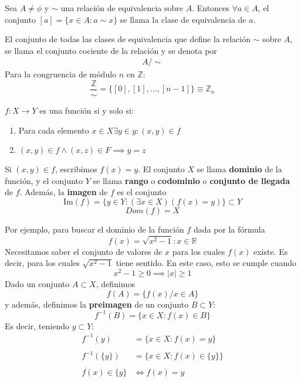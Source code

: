 \documentclass{../Topologia.tex}
\begin{document}
\begin{defin}
Sea $A \neq \phi$ y $\sim$ una relación de equivalencia sobre $A$. Entonces $\forall a \in A$, el conjunto $[a] = \{ x \in A : a \sim x \}$ se llama la clase de equivalencia de $a$.
\end{defin}

\begin{defin}
El conjunto de todas las clases de equivalencia que define la relación $\sim$ sobre $A$, se llama el conjunto cociente de la relación y se denota por
\begin{equation}
	\begin{split}
\boxed{A / \sim}
	\end{split}
\end{equation}
Para la congruencia de módulo $n$ en $\mathbb{Z}$:
$$
\frac{\mathbb{Z}}{\sim} = \{ [0],[1],\dots,[n-1] \} \equiv \mathbb{Z}_{n}
$$
\end{defin}

\begin{defin}
$f:X\to Y$ es una función si y solo si:
\begin{enumerate}
    \item Para cada elemento $x \in X \exists y \in y : (x,y) \in f$
    \item $(x,y) \in f \wedge (x,z) \in F \implies y = z$
\end{enumerate}
Si $(x,y) \in f$, escribimos $f(x)=y$. El conjunto $X$ se llama \textbf{dominio} de la función, y el conjunto $Y$ se llama \textbf{rango} o \textbf{codominio} o \textbf{conjunto de llegada} de $f$.
Además, la \textbf{imagen} de $f$ es el conjunto
$$
\mathrm{Im}(f)=\{ y \in Y : (\exists x \in X)(f(x)=y) \} \subset Y
$$
$$
Dom (f) = X
$$
\end{defin}

Por ejemplo, para buscar el dominio de la función $f$ dada por la fórmula
$$
f(x)=\sqrt{ x^{2}-1 }:x \in \mathbb{R}
$$
Necesitamos saber el conjunto de valores de $x$ para los cuales $f(x)$ existe. Es decir, para los cuales $\sqrt{ x^{2}-1 }$ tiene sentido. En este caso, esto se cumple cuando
$$
x^{2}-1\geq 0 \implies |x|\geq 1
$$
\vspace{1em}
Dado un conjunto $A \subset X$, definimos
$$
f(A)= \{ f(x) / x \in A \}
$$
y además, definimos la \textbf{preimagen} de un conjunto $B \subset Y$:
$$
f^{-1}(B)= \{ x \in X : f(x) \in B \}
$$
Es decir, teniendo $y \subset Y$:
\begin{equation}
	\begin{split}
f^{-1}(y)&= \{ x \in X : f(x)=y \}\\ \\
f^{-1}(\{ y \})&= \{ x \in X : f(x)\in \{ y \} \}\\ \\
f(x) \in \{  y \}&\iff f(x)=y
	\end{split}
\end{equation}
\end{document}
